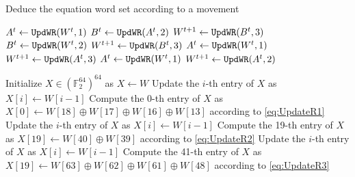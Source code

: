 \begin{algorithm}[htbp]
	\caption{Deduce the equation word set according to a movement} \label{alg:updateW}
	\begin{algorithmic}[1]
\State $A^t\leftarrow {\tt{UpdWR}}(W^t,1)$
\State $B^t\leftarrow {\tt{UpdWR}}(A^t,2)$
\State $W^{t+1}\leftarrow {\tt{UpdWR}}(B^t,3)$
\EndIf
{}
\State $B^t\leftarrow {\tt{UpdWR}}(W^t,2)$
\State $W^{t+1}\leftarrow {\tt{UpdWR}}(B^t,3)$
\EndIf
{}
\State $A^t\leftarrow {\tt{UpdWR}}(W^t,1)$
\State $W^{t+1}\leftarrow {\tt{UpdWR}}(A^t,3)$
\EndIf
{}
\State $A^t\leftarrow {\tt{UpdWR}}(W^t,1)$
\State $W^{t+1}\leftarrow {\tt{UpdWR}}(A^t,2)$
\EndIf
		\EndProcedure
	\end{algorithmic}
\begin{algorithmic}[1]
\State Initialize $X\in (\mathbb{F}_2^{64})^{64}$ as $X\leftarrow W$
\State Update the $i$-th entry of $X$ as $X[i]\leftarrow W[i-1]$
\EndFor
\State Compute the 0-th entry of $X$ as $X[0]\leftarrow W[18]\oplus W[17]\oplus W[16]\oplus W[13]$ according to \eqref{eq:UpdateR1}
\EndIf
{}
\State Update the $i$-th entry of $X$ as $X[i]\leftarrow W[i-1]$
\EndFor
\State Compute the 19-th entry of $X$ as $X[19]\leftarrow W[40]\oplus W[39]$ according to \eqref{eq:UpdateR2}
\EndIf
{}
\State Update the $i$-th entry of $X$ as $X[i]\leftarrow W[i-1]$
\EndFor
\State Compute the 41-th entry of $X$ as $X[19]\leftarrow W[63]\oplus W[62]\oplus W[61]\oplus W[48]$ according to \eqref{eq:UpdateR3}
\EndIf
		\EndProcedure
	\end{algorithmic}
\end{algorithm}

